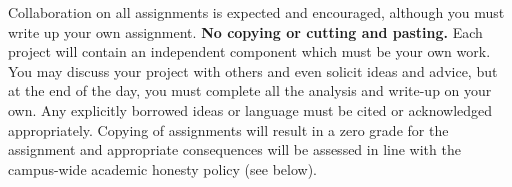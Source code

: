 \documentclass[10pt]{article}
\begin{document}
\clearpage
\bigskip
{}

 Collaboration on all assignments is expected and encouraged, although you must write up your own assignment. {\bf No copying or cutting and pasting.} Each project will contain an independent component which must be your own work. You may discuss your project with others and even solicit ideas and advice, but at the end of the day, you must complete all the analysis and write-up on your own. Any explicitly borrowed ideas or language must be cited or acknowledged appropriately. Copying of assignments will result in a zero grade for the assignment and appropriate consequences will be assessed in line with the campus-wide academic honesty policy (see below). \\




\end{document}
